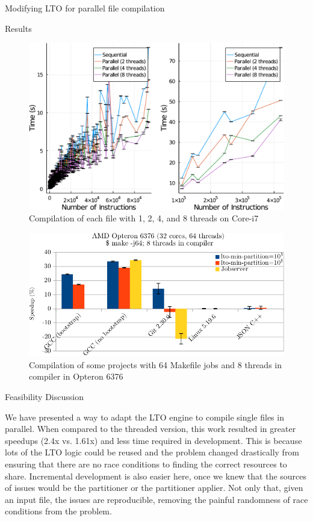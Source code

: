 \begin{section}{Modifying LTO for parallel file compilation}
\begin{subsection}{Results}
\begin{figure}
\centering
	 \includegraphics[scale=0.6]{figuras/times-insns-crop.pdf}
	  \caption{Compilation of each file with 1, 2, 4, and 8 threads on
	  Core-i7}
	  \label{fig:gcc_all_files}
\end{figure}

\begin{figure}
\centering
	 \includegraphics[scale=0.85]{figuras/experiment_projects_new-crop.pdf}
	  \caption{Compilation of some projects with 64 Makefile jobs and 8 threads in compiler in Opteron 6376}
	  \label{fig:gcc_projects}
\end{figure}

\end{subsection}

\begin{subsection}{Feasibility Discussion}

We have presented a way to adapt the LTO engine to compile single files in
parallel. When compared to the threaded version, this work resulted in greater
speedups (2.4x vs. 1.61x) and less time required in development. This is
because lots of the LTO logic could be reused and the problem changed
drastically from ensuring that there are no race conditions to finding the
correct resources to share. Incremental development is also easier here, once
we knew that the sources of issues would be the partitioner or the partitioner
applier. Not only that, given an input file, the issues are reproducible,
removing the painful randomness of race conditions from the problem. 


\end{subsection}
\end{section}
